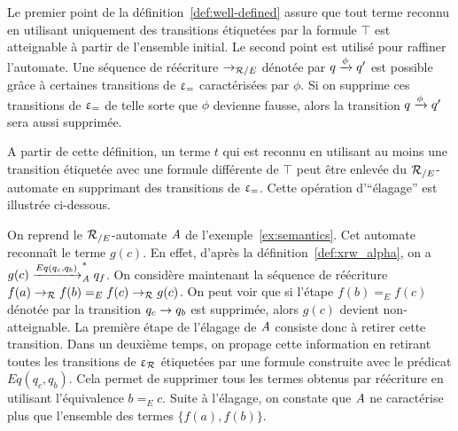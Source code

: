 \noindent
Le premier point de la définition~\ref{def:well-defined} assure que
tout terme reconnu en utilisant uniquement des transitions étiquetées
par la formule $\top$ est atteignable à partir de l'ensemble initial.
Le second point est utilisé pour raffiner l'automate. Une séquence de réécriture
$\rightarrow_{\mathcal R/E}$ dénotée par $q \xrightarrow{\phi} q'$ est possible grâce à certaines transitions
de $\upvarepsilon_{=}$ caractérisées par $\phi$. Si on supprime ces transitions de $\upvarepsilon_{=}$ de telle sorte
que $\phi$ devienne fausse, alors la transition $q \xrightarrow{\phi} q'$ sera aussi supprimée.

A partir de cette définition, un terme $t$ qui est reconnu en 
utilisant au moins une transition étiquetée avec une formule différente de $\top$
peut être enlevée du ${\mathcal R_{/E}}$-automate en supprimant des transitions de $\upvarepsilon_{=}$.
Cette opération d'``élagage''  est illustrée ci-dessous.

\begin{example}
  \label{ex:pruning}
  On reprend le ${\mathcal R_{/E}}$-automate $\mathit A$ de l'exemple~\ref{ex:semantics}.
  Cet automate reconnaît le terme $g(c)$. En effet, d'après la
  définition~\ref{def:xrw_alpha}, on a $g(c) \xrightarrow{Eq(q_c, q_b)}_\mathit A^* q_f$. On considère maintenant la séquence de réécriture $f(a) \rightarrow_\mathcal R f(b) =_E f(c) 
  \rightarrow_\mathcal R g(c)$. On peut voir que si l'étape $f(b) =_E f(c)$ dénotée par la 
  transition $q_c \rightarrow q_b$ est supprimée, alors $g(c)$ devient non-atteignable. 
  La première étape de l'élagage de $\mathit A$ consiste donc à retirer cette
  transition. Dans un deuxième temps, on propage cette information en retirant
  toutes les transitions de $\upvarepsilon_{\mathcal R}$ étiquetées par une formule construite avec le prédicat $Eq(q_c, q_b)$.
  Cela permet de supprimer tous les termes obtenus par réécriture en utilisant l'équivalence $b =_E c$.
  Suite à l'élagage, on constate que $\mathit A$ ne caractérise plus que l'ensemble des termes $\{f(a), f(b)\}$.
\end{example}





